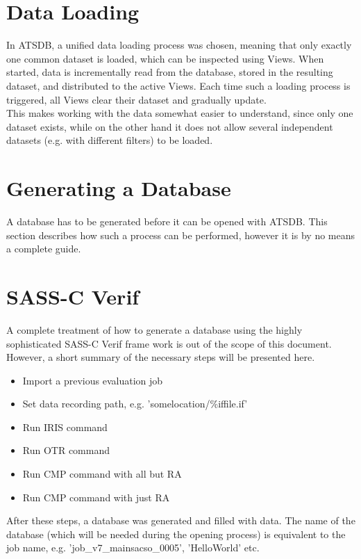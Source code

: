 \documentclass[10pt,letterpaper,extrafontsizes]{memoir}
\begin{document}
\section*{Data Loading}
In ATSDB, a unified data loading process was chosen, meaning that only exactly one common dataset is loaded, which can be inspected using Views. When started, data is incrementally read from the database, stored in the resulting dataset, and distributed to the active Views. Each time such a loading process is triggered, all Views clear their dataset and gradually update. \\
This makes working with the data somewhat easier to understand, since only one dataset exists, while on the other hand it does not allow several independent datasets (e.g. with different filters) to be loaded.

\section*{Generating a Database}
\label{sec:generation}

A database has to be generated before it can be opened with ATSDB.  This section describes how such
a process can be performed, however it is by no means a complete guide.

\section*{SASS-C Verif}
A complete treatment of how to generate a database using the highly sophisticated SASS-C Verif frame work  is  out  of  the  scope  of  this  document.   However,  a  short  summary  of  the  necessary  steps  will  be presented here.\\

\begin{itemize}  
\item Import a previous evaluation job
\item Set data recording path, e.g. 'somelocation/\%iffile.if'
\item Run IRIS command
\item Run OTR command
\item Run CMP command with all but RA
\item Run CMP command with just RA
\end{itemize}

After  these  steps,  a  database  was  generated  and  filled  with  data.   The  name  of  the  database  (which
will  be  needed  during  the  opening  process)  is  equivalent  to  the  job  name,  e.g.   'job\_v7\_mainsacso\_0005', 'HelloWorld' etc. \\
\end{document}
